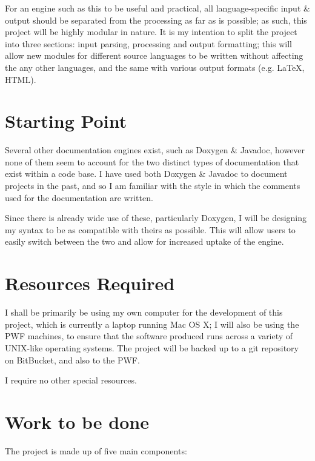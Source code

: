 For an engine such as this to be useful and practical, all
language-specific input \& output should be separated from the
processing as far as is possible; as such, this project will be highly
modular in nature. It is my intention to split the project into three
sections: input parsing, processing and output formatting; this will
allow new modules for different source languages to be written without
affecting the any other languages, and the same with various output
formats (e.g. \LaTeX, HTML).

\section{Starting Point}

Several other documentation engines exist, such as Doxygen \& Javadoc,
however none of them seem to account for the two distinct types of
documentation that exist within a code base. I have used both Doxygen
\& Javadoc to document projects in the past, and so I am familiar with
the style in which the comments used for the documentation are
written.

Since there is already wide use of these, particularly Doxygen, I will
be designing my syntax to be as compatible with theirs as
possible. This will allow users to easily switch between the two and
allow for increased uptake of the engine.

\section{Resources Required}

I shall be primarily be using my own computer for the development of
this project, which is currently a laptop running Mac OS X; I will
also be using the PWF machines, to ensure that the software produced
runs across a variety of UNIX-like operating systems. The project
will be backed up to a git repository on BitBucket, and also to the
PWF.

I require no other special resources.

\section{Work to be done}

The project is made up of five main components:

